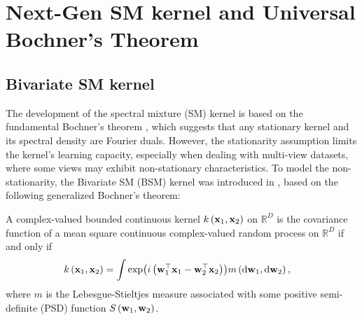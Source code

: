 \glsresetall
\renewcommand{\contentsname}%
\tableofcontents
\vspace{.3in}

\newpage

\section{Next-Gen SM kernel and Universal Bochner's Theorem}
\subsection{Bivariate SM kernel}
\label{app:generized_sm_kernel}
The development of the spectral mixture (\MakeUppercase{sm}) kernel is based on the fundamental Bochner's theorem \citep{wilson2013gaussian}, which suggests that any stationary kernel
and its spectral density are Fourier duals. However, the stationarity assumption limits the kernel's learning capacity, especially when dealing with multi-view datasets, where some views may exhibit non-stationary characteristics. To model the non-stationarity, the \MakeUppercase{b}ivariate \MakeUppercase{sm} (\MakeUppercase{bsm}) kernel was introduced in \citep{remes2017non,samo2015generalized}, based on the following generalized Bochner's theorem:
\begin{theorem} 
\label{theo:Gen_Bochner_old}
A complex-valued bounded continuous kernel \( k\left({\mathbf x}_1, {\mathbf x}_2\right) \) on \( \mathbb{R}^D \) is the covariance function of a mean square continuous complex-valued random process on  \( \mathbb{R}^D \) if and only if
\begin{equation}
\label{eq:gen_bochener_old}
\begin{aligned}
& k\left({\mathbf x}_1, {\mathbf x}_2\right) =  \int
 \exp(i\left({\mathbf w}_1^{\top} {\mathbf x}_1 - {\mathbf w}_2^{\top} {\mathbf x}_2\right)) m\left(\mathrm{d} {\mathbf w}_1, \mathrm{d} {\mathbf w}_2\right),
\end{aligned}
\end{equation}
where \( m \) is the Lebesgue-Stieltjes measure associated with some positive semi-definite (PSD) function \( S\left({\mathbf w}_1, {\mathbf w}_2\right) \). 
\end{theorem}

